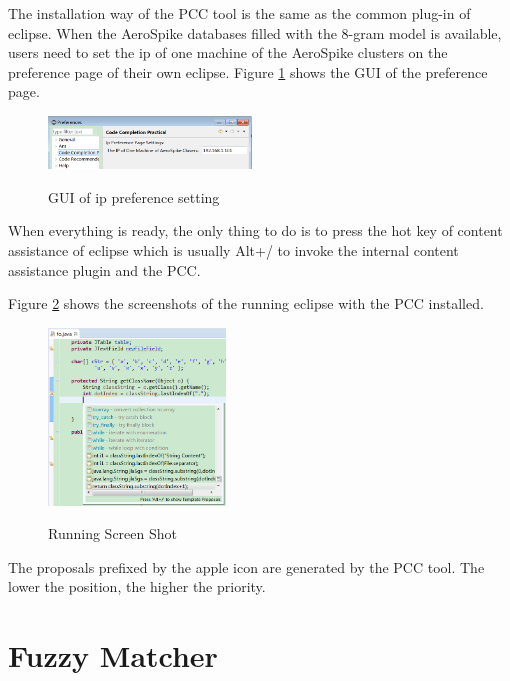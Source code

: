 \documentclass{sig-alternate-05-2015}
\begin{document}
The installation way\cite{eclipseplugininstall} of the PCC tool is the same as the common plug-in\cite{eclipseplugins} of eclipse\cite{eclipseplatform}. When the AeroSpike databases filled with the 8-gram model is available, users need to set the ip of one machine of the AeroSpike clusters on the preference page of their own eclipse. Figure \ref{GUIpreference} shows the GUI of the preference page.
\\\begin{figure}[htbp]
  \centering
  \includegraphics[width=0.48\textwidth]{pics/preferencesetting.png}\\
  \caption{GUI of ip preference setting}\label{GUIpreference}
\end{figure}

When everything is ready, the only thing to do is to press the hot key of content assistance of eclipse which is usually Alt+/ to invoke the internal content assistance plugin and the PCC.

Figure \ref{codecomprunexample} shows the screenshots of the running eclipse with the PCC installed.
\\\begin{figure}[htbp]
  \centering
  \includegraphics[width=0.42\textwidth]{pics/codecomprunexample.png}\\
  \caption{Running Screen Shot}\label{codecomprunexample}
\end{figure}

The proposals prefixed by the apple icon are generated by the PCC tool. The lower the position, the higher the priority.

\section{Fuzzy Matcher}
\end{document}
